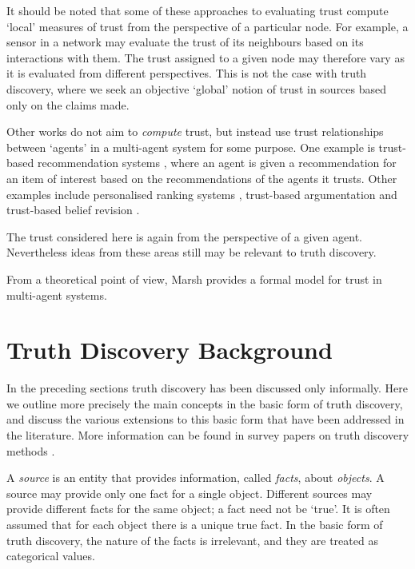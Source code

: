 \documentclass[../main.tex]{subfiles}
\begin{document}
It should be noted that some of these approaches to evaluating trust compute
`local' measures of trust from the perspective of a particular node. For
example, a sensor in a network may evaluate the trust of its neighbours based
on its interactions with them. The trust assigned to a given node may therefore
vary as it is evaluated from different perspectives. This is not the case with
truth discovery, where we seek an objective `global' notion of trust in sources
based only on the claims made.

Other works do not aim to \emph{compute} trust, but instead use trust
relationships between `agents' in a multi-agent system for some purpose. One
example is trust-based recommendation systems \cite{andersen}, where an agent
is given a recommendation for an item of interest based on the recommendations
of the agents it trusts. Other examples include personalised ranking systems
\cite{altman_personalised}, trust-based argumentation \cite{tang} and
trust-based belief revision \cite{booth}.

The trust considered here is again from the perspective of a given agent.
Nevertheless ideas from these areas still may be relevant to truth discovery.

From a theoretical point of view, Marsh \cite{marsh} provides a formal model
for trust in multi-agent systems.

\section{Truth Discovery Background}

In the preceding sections truth discovery has been discussed only informally.
Here we outline more precisely the main concepts in the basic form of truth
discovery, and discuss the various extensions to this basic form that have been
addressed in the literature. More information can be found in survey papers on
truth discovery methods \cite{li_survey, gupta_han_survey}.

A \emph{source} is an entity that provides information, called \emph{facts},
about \emph{objects}. A source may provide only one fact for a single object.
Different sources may provide different facts for the same object; a fact need
not be `true'. It is often assumed that for each object there is a unique true
fact. In the basic form of truth discovery, the nature of the facts is
irrelevant, and they are treated as categorical values\footnotemark.

\end{document}
